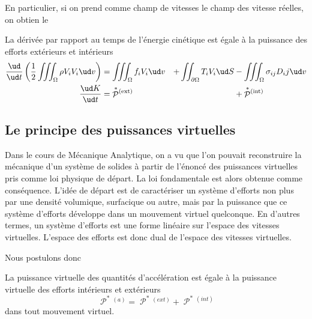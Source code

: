 En particulier, si on prend comme champ de vitesses le champ des vitesse réelles, on obtien le
\begin{thm}
    La dérivée par rapport au temps de l'énergie cinétique est égale à la puissance des efforts extérieurs et intérieurs
    \begin{align}
        \frac{\ud}{\ud t}\left( \frac{1}{2}\iiint_{\Omega} \rho V_iV_i \ud v\right) &= \iiint_{\Omega} f_i V_i \ud v &+ \iint_{\partial\Omega} T_i V_i \ud S &- \iiint_{\Omega} \sigma_{ij} D_ij \ud v \nonumber\\
        \frac{\ud K}{\ud t} &= \mathop{\mathcal{P}}^{\ast}{\!}^{(\text{ext})} &&+ \mathop{\mathcal{P}}^{\ast}{\!}^{(\text{int})}
        \label{eq:Ch01-029}
    \end{align}
\end{thm}
\subsection{Le principe des puissances virtuelles} \label{ssec:Ch01-2.2}
Dans le cours de Mécanique Analytique, on a vu que l'on pouvait reconstruire la mécanique d'un système de solides à partir de l'énoncé des puissances virtuelles pris comme loi physique de départ.
La loi fondamentale est alors obtenue comme conséquence.
L'idée de départ est de caractériser un système d'efforts non plus par une densité volumique, surfacique ou autre, mais par la puissance que ce système d'efforts développe dans un mouvement virtuel quelconque.
En d'autres termes, un système d'efforts est une forme linéaire sur l'espace des vitesses virtuelles.
L'espace des efforts est donc dual de l'espace des vitesses virtuelles.

Nous postulons donc
\begin{Principe}
    La puissance virtuelle des quantités d'accélération est égale à la puissance virtuelle des efforts intérieurs et extérieurs
    \begin{equation}
        \mathop{\mathcal{P}}^{\ast}{\!}^{(a)} = \mathop{\mathcal{P}}^{\ast}{\!}^{(ext)} + \mathop{\mathcal{P}}^{\ast}{\!}^{(int)}
        \label{eq:Ch01-030}
    \end{equation}
    dans tout mouvement virtuel.
\end{Principe}



